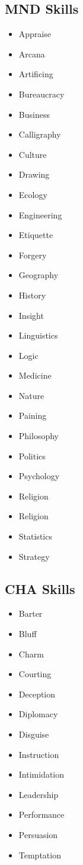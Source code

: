 \documentclass[]{article}
\providecommand{\tightlist}{%
  \setlength{\itemsep}{0pt}\setlength{\parskip}{0pt}}
\begin{document}
\subsection{MND Skills}\label{mnd-skills}

\begin{itemize}
\tightlist
\item
  Appraise
\item
  Arcana
\item
  Artificing
\item
  Bureaucracy
\item
  Business
\item
  Calligraphy
\item
  Culture
\item
  Drawing
\item
  Ecology
\item
  Engineering
\item
  Etiquette
\item
  Forgery
\item
  Geography
\item
  History
\item
  Insight
\item
  Linguistics
\item
  Logic
\item
  Medicine
\item
  Nature
\item
  Paining
\item
  Philosophy
\item
  Politics
\item
  Psychology
\item
  Religion
\item
  Religion
\item
  Statistics
\item
  Strategy
\end{itemize}

\subsection{CHA Skills}\label{cha-skills}

\begin{itemize}
\tightlist
\item
  Barter
\item
  Bluff
\item
  Charm
\item
  Courting
\item
  Deception
\item
  Diplomacy
\item
  Disguise
\item
  Instruction
\item
  Intimidation
\item
  Leadership
\item
  Performance
\item
  Persuasion
\item
  Temptation
\end{itemize}
\end{document}
